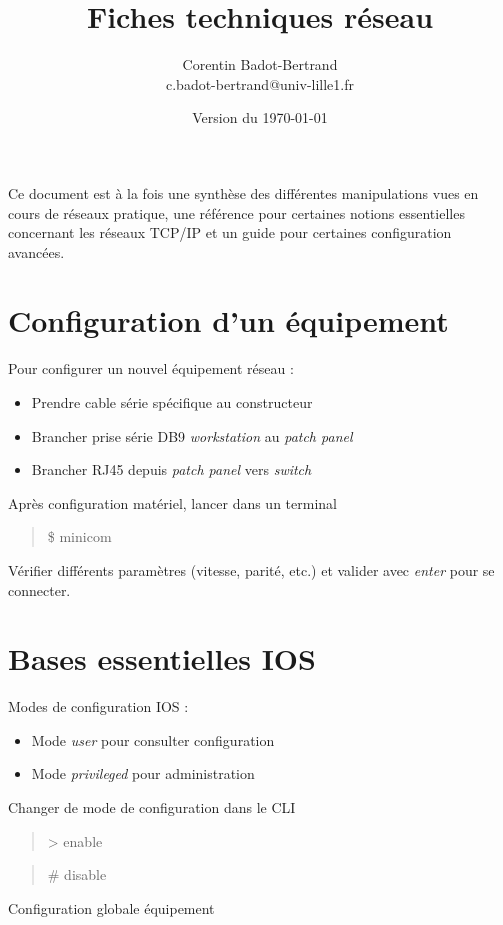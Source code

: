 \documentclass[a4paper, 11pt]{article}
\title{Fiches techniques réseau}
\author{
	Corentin Badot-Bertrand\\
	c.badot-bertrand@univ-lille1.fr
}
\date{Version du \today}
\newcommand{\commande}[1] {
    \begin{quote}
    \tt\raggedright #1
    \end{quote}
}
\begin{document}
\maketitle

Ce document est à la fois une synthèse des différentes manipulations vues en cours de réseaux pratique, une référence pour certaines notions essentielles concernant les réseaux TCP/IP et un guide pour certaines configuration avancées.

\tableofcontents

\newpage

\section{Configuration d'un équipement}

Pour configurer un nouvel équipement réseau : 

\begin{itemize}
\item Prendre cable série spécifique au constructeur
\item Brancher prise série DB9 \textit{workstation} au \textit{patch panel}
\item Brancher RJ45 depuis \textit{patch panel} vers \textit{switch}
\\
\end{itemize}

Après configuration matériel, lancer dans un terminal

\commande{\$ minicom}

Vérifier différents paramètres (vitesse, parité, etc.) et valider avec \textit{enter} pour se connecter.

\section{Bases essentielles IOS}

Modes de configuration IOS :

\begin{itemize}
\item Mode \textit{user} pour consulter configuration
\item Mode \textit{privileged} pour administration
\\
\end{itemize}

Changer de mode de configuration dans le CLI

\commande{> enable}
\commande{\# disable}

Configuration globale équipement
\end{document}
